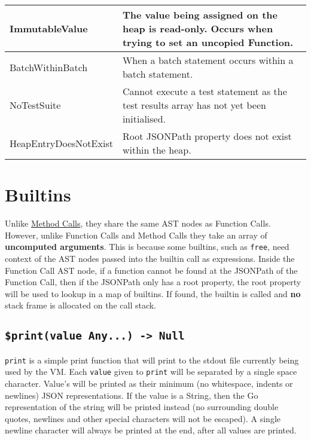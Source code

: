 \begin{center}
    \small
    \begin{tabular}{| m{5cm} | m{5cm} |}
        \hline
        ImmutableValue & The value being assigned on the heap is read-only. Occurs when trying to set an uncopied Function.\\
        \hline
        BatchWithinBatch & When a batch statement occurs within a batch statement.\\
        \hline
        NoTestSuite & Cannot execute a test statement as the test results array has not yet been initialised.\\
        \hline
        HeapEntryDoesNotExist & Root JSONPath property does not exist within the heap.\\
        \hline
    \end{tabular}
\end{center}
\normalsize

\section{Builtins}
\label{sec:builtins}

Unlike \hyperref[sec:method-calls]{Method Calls}, they share the same AST nodes as Function Calls. However, unlike Function Calls and Method Calls they take an array of \textbf{uncomputed arguments}. This is because some builtins, such as \verb|free|, need context of the AST nodes passed into the builtin call as expressions. Inside the Function Call AST node, if a function cannot be found at the JSONPath of the Function Call, then if the JSONPath only has a root property, the root property will be used to lookup in a map of builtins. If found, the builtin is called and \textbf{no} stack frame is allocated on the call stack.

\cprotect\subsection{\verb|$print(value Any...) -> Null|}

\verb|print| is a simple print function that will print to the stdout file currently being used by the VM. Each \verb|value| given to \verb|print| will be separated by a single space character. Value's will be printed as their minimum (no whitespace, indents or newlines) JSON representations. If the value is a String, then the Go representation of the string will be printed instead (no surrounding double quotes, newlines and other special characters will not be escaped). A single newline character will always be printed at the end, after all values are printed.

